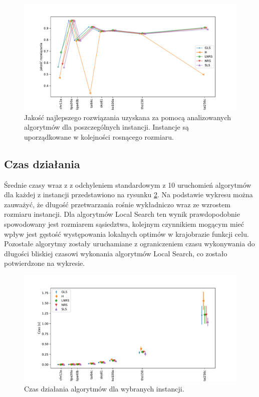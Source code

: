 \documentclass{article}
\begin{document}
\begin{figure}[H]
	\centering
	\includegraphics[width=\linewidth]{figs/quality_best.pdf}
	\caption{Jakość najlepszego rozwiązania uzyskana za pomocą analizowanych algorytmów dla poszczególnych instancji. Instancje są uporządkowane w kolejności rosnącego rozmiaru.}
	\label{fig:quality_mean}
\end{figure}
\subsection{Czas działania}
Średnie czasy wraz z z odchyleniem standardowym z 10 uruchomień algorytmów dla każdej z instancji przedstawiono na rysunku \ref{fig:time_mean}. Na podstawie wykresu można zauważyć, że długość przetwarzania rośnie wykładniczo wraz ze wzrostem rozmiaru instancji. Dla algorytmów Local Search ten wynik prawdopodobnie spowodowany jest rozmiarem sąsiedztwa, kolejnym czynnikiem mogącym mieć wpływ jest gęstość występowania lokalnych optimów w krajobrazie funkcji celu. Pozostałe algorytmy zostały uruchamiane z ograniczeniem czasu wykonywania do długości bliskiej czasowi wykonania algorytmów Local Search, co zostało potwierdzone na wykresie.
\begin{figure}[H]
	\centering
	\includegraphics[width=\linewidth]{figs/mean_time.pdf}
	\caption{Czas działania algorytmów dla wybranych instancji.}
	\label{fig:time_mean}
\end{figure}
\end{document}
